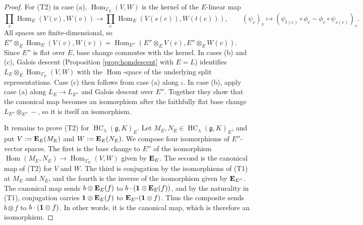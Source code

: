 \documentclass[a4paper,12pt,reqno]{amsart}
\newcommand{\EE}{{\rm\bf E}}
\DeclareMathOperator{\Hom}{\mathrm{Hom}}
\DeclareMathOperator{\HC}{\mathrm{HC}}
\theoremstyle{plain}
\theoremstyle{remark}
\begin{document}
\begin{proof}
    For (T2) in case (a), $\Hom_{\Gamma_E}(V,W)$ is the kernel of the $E$-linear map
    \[
      \prod_v\Hom_E(V(v),W(v))\to\prod_e\Hom_E(V(s(e)),W(t(e))),\qquad(\psi_v)_v\mapsto(\psi_{t(e)}\circ\phi_e-\phi_e\circ\psi_{s(e)})_e.
    \]
    All spaces are finite-dimensional, so $E''\otimes_E\Hom_E(V(v),W(v))=\Hom_{E''}(E''\otimes_EV(v),E''\otimes_EW(v))$. Since $E''$ is flat over $E$, base change commutes with the kernel. In cases (b) and (c), Galois descent (Proposition \ref{prop:homdescent} with $E=L$) identifies $L_E\otimes_E\Hom_{\Gamma_E}(V,W)$ with the $\Hom$-space of the underlying split representations. Case (c) then follows from case (a) along $\iota$. In case (b), apply case (a) along $L_E\to L_{E''}$ and Galois descent over $E''$. Together they show that the canonical map becomes an isomorphism after the faithfully flat base change $L_{E''}\otimes_{E''}-$, so it is itself an isomorphism.

    It remains to prove (T2) for $\HC_\lambda(\mathfrak{g},K)_E$. Let $M_E,N_E\in\HC_\lambda(\mathfrak{g},K)_E$, and put $V:=\EE_E(M_E)$ and $W:=\EE_E(N_E)$. We compose four isomorphisms of $E''$-vector spaces. The first is the base change to $E''$ of the isomorphism $\Hom(M_E,N_E)\to\Hom_{\Gamma_E}(V,W)$ given by $\EE_E$. The second is the canonical map of (T2) for $V$ and $W$. The third is conjugation by the isomorphisms of (T1) at $M_E$ and $N_E$, and the fourth is the inverse of the isomorphism given by $\EE_{E''}$. The canonical map sends $b\otimes\EE_E(f)$ to $b\cdot({\bf1}\otimes\EE_E(f))$, and by the naturality in (T1), conjugation carries ${\bf1}\otimes\EE_E(f)$ to $\EE_{E''}({\bf1}\otimes f)$. Thus the composite sends $b\otimes f$ to $b\cdot({\bf1}\otimes f)$. In other words, it is the canonical map, which is therefore an isomorphism.
    \end{proof}
\end{document}
